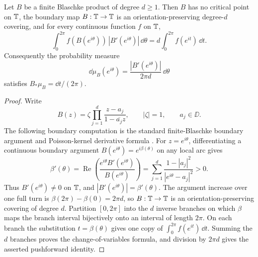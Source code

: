 \begin{lemma}\label{lem:finite-blaschke-boundary-covering-formula}
Let \(B\) be a finite Blaschke product of degree \(d\ge1\).  Then \(B\) has no critical point on \(\mathbb{T}\), the boundary map \(B:\mathbb{T}\to\mathbb{T}\) is an orientation-preserving degree-\(d\) covering, and for every continuous function \(f\) on \(\mathbb{T}\),
\[
\int_{0}^{2\pi} f(B(e^{i\theta}))\,|B'(e^{i\theta})|\,\dd\theta
=d\int_{0}^{2\pi}f(e^{it})\,\dd t.
\]
Consequently the probability measure
\[
\dd\mu_B(e^{i\theta})=\frac{|B'(e^{i\theta})|}{2\pi d}\,\dd\theta
\]
satisfies \(B_\ast\mu_B=\dd t/(2\pi)\).
\end{lemma}

\begin{proof}
Write
\[
B(z)=\zeta\prod_{j=1}^{d}\frac{z-a_j}{1-\overline{a_j}z},
\qquad |\zeta|=1,
\qquad a_j\in\DD.
\]
The following boundary computation is the standard finite-Blaschke boundary argument and Poisson-kernel derivative formula \citep[Sec.~1.2]{Duren1970}.  For \(z=e^{i\theta}\), differentiating a continuous boundary argument \(B(e^{i\theta})=e^{i\beta(\theta)}\) on any local arc gives
\[
\beta'(\theta)=\operatorname{Re}\left(\frac{e^{i\theta}B'(e^{i\theta})}{B(e^{i\theta})}\right)
=
\sum_{j=1}^{d}\frac{1-|a_j|^2}{|e^{i\theta}-a_j|^2}>0.
\]
Thus \(B'(e^{i\theta})\ne0\) on \(\mathbb{T}\), and \(|B'(e^{i\theta})|=\beta'(\theta)\).  The argument increase over one full turn is \(\beta(2\pi)-\beta(0)=2\pi d\), so \(B:\mathbb{T}\to\mathbb{T}\) is an orientation-preserving covering of degree \(d\).  Partition \([0,2\pi]\) into the \(d\) inverse branches on which \(\beta\) maps the branch interval bijectively onto an interval of length \(2\pi\).  On each branch the substitution \(t=\beta(\theta)\) gives one copy of \(\int_0^{2\pi}f(e^{it})\,\dd t\).  Summing the \(d\) branches proves the change-of-variables formula, and division by \(2\pi d\) gives the asserted pushforward identity.
\end{proof}

